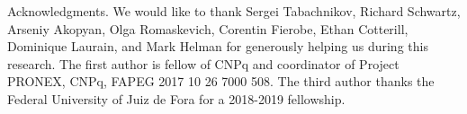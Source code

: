 \begin{acknowledgment}{Acknowledgments.}
 We would like to thank  
Sergei Tabachnikov, Richard Schwartz, Arseniy Akopyan, Olga Romaskevich, Corentin Fierobe, Ethan Cotterill, Dominique Laurain, and Mark Helman for generously helping us during this research.  The first author is fellow of CNPq and coordinator of Project PRONEX, CNPq, FAPEG 2017 10 26 7000 508. The third author thanks the Federal University of Juiz de Fora for a 2018-2019 fellowship.
\end{acknowledgment}
